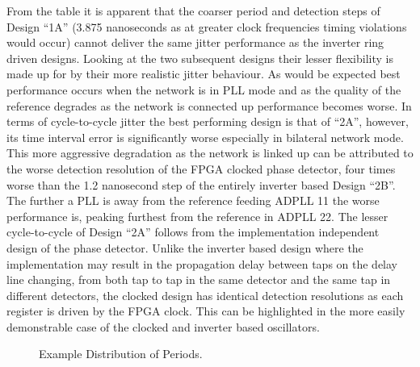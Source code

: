\documentclass[conference]{IEEEtran}
\begin{document}
From the table it is apparent that the coarser period and detection steps of Design ``1A'' (3.875 nanoseconds as at greater clock frequencies timing violations would occur) cannot deliver the same jitter performance as the inverter ring driven designs. Looking at the two subsequent designs their lesser flexibility is made up for by their more realistic jitter behaviour. As would be expected best performance occurs when the network is in PLL mode and as the quality of the reference degrades as the network is connected up performance becomes worse. In terms of cycle-to-cycle jitter the best performing design is that of ``2A'', however, its time interval error is significantly worse especially in bilateral network mode. This more aggressive degradation as the network is linked up can be attributed to the worse detection resolution of the FPGA clocked phase detector, four times worse than the 1.2 nanosecond step of the entirely inverter based Design ``2B''.\\
The further a PLL is away from the reference feeding ADPLL 11 the worse performance is, peaking furthest from the reference in ADPLL 22.
The lesser cycle-to-cycle of Design ``2A'' follows from the implementation independent design of the phase detector. Unlike the inverter based design where the implementation may result in the propagation delay between taps on the delay line changing, from both tap to tap in the same detector and the same tap in different detectors, the clocked design has identical detection resolutions as each register is driven by the FPGA clock. This can be highlighted in the more easily demonstrable case of the clocked and inverter based oscillators.\\
\begin{figure}[h]%
    \centering
    \caption{Example Distribution of Periods.\label{fig:dists}}    
    \vspace{-0.5cm}
\end{figure}
\end{document}
